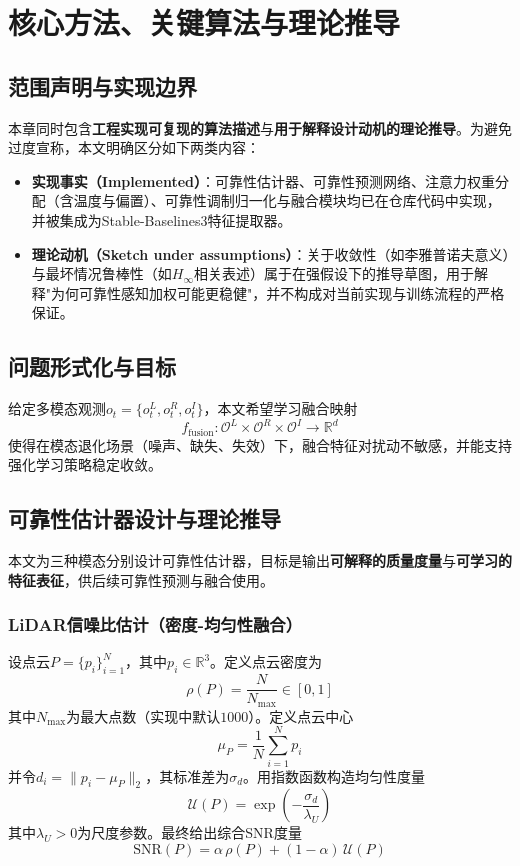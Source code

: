 \chapter{核心方法、关键算法与理论推导}
\label{chapter-method}

\section{范围声明与实现边界}
本章同时包含\textbf{工程实现可复现的算法描述}与\textbf{用于解释设计动机的理论推导}。为避免过度宣称，本文明确区分如下两类内容：
\begin{itemize}
    \item \textbf{实现事实（Implemented）}：可靠性估计器、可靠性预测网络、注意力权重分配（含温度与偏置）、可靠性调制归一化与融合模块均已在仓库代码中实现，并被集成为Stable-Baselines3特征提取器。
    \item \textbf{理论动机（Sketch under assumptions）}：关于收敛性（如李雅普诺夫意义）与最坏情况鲁棒性（如$H_\infty$相关表述）属于在强假设下的推导草图，用于解释"为何可靠性感知加权可能更稳健"，并不构成对当前实现与训练流程的严格保证。
\end{itemize}

\section{问题形式化与目标}
给定多模态观测$o_t=\{o_t^L,o_t^R,o_t^I\}$，本文希望学习融合映射
\begin{equation}
    f_\text{fusion}: \mathcal{O}^L\times\mathcal{O}^R\times\mathcal{O}^I \rightarrow \mathbb{R}^{d}
\end{equation}
使得在模态退化场景（噪声、缺失、失效）下，融合特征对扰动不敏感，并能支持强化学习策略稳定收敛。

\section{可靠性估计器设计与理论推导}
本文为三种模态分别设计可靠性估计器，目标是输出\textbf{可解释的质量度量}与\textbf{可学习的特征表征}，供后续可靠性预测与融合使用。

\subsection{LiDAR信噪比估计（密度-均匀性融合）}
设点云$P=\{p_i\}_{i=1}^{N}$，其中$p_i\in\mathbb{R}^3$。定义点云密度为
\begin{equation}
    \rho(P)=\frac{N}{N_{\max}}\in[0,1]
\end{equation}
其中$N_{\max}$为最大点数（实现中默认$1000$）。定义点云中心
\begin{equation}
    \mu_P=\frac{1}{N}\sum_{i=1}^{N} p_i
\end{equation}
并令$d_i=\lVert p_i-\mu_P\rVert_2$，其标准差为$\sigma_d$。用指数函数构造均匀性度量
\begin{equation}
    \mathcal{U}(P)=\exp\left(-\frac{\sigma_d}{\lambda_U}\right)
\end{equation}
其中$\lambda_U>0$为尺度参数。最终给出综合SNR度量
\begin{equation}
    \mathrm{SNR}(P)=\alpha\,\rho(P)+(1-\alpha)\,\mathcal{U}(P)
\end{equation}

